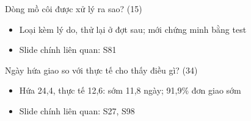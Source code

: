 \begin{frame}{Dòng mồ côi được xử lý ra sao? (15)}
\begin{itemize}
  \item Loại kèm lý do, thử lại ở đợt sau; mới chứng minh bằng test
  \item Slide chính liên quan: S81
\end{itemize}


\end{frame}

\begin{frame}{Ngày hứa giao so với thực tế cho thấy điều gì? (34)}
\begin{itemize}
  \item Hứa 24,4, thực tế 12,6: sớm 11,8 ngày; 91,9\% đơn giao sớm
  \item Slide chính liên quan: S27, S98
\end{itemize}


\end{frame}
